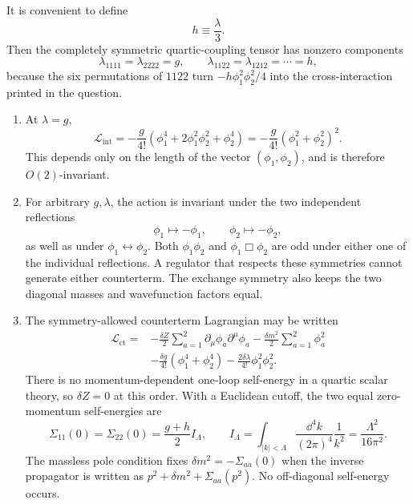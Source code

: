 \begin{enumerate}
It is convenient to define
\[
 h\equiv\frac\lambda3.
\]
Then the completely symmetric quartic-coupling tensor has nonzero
components
\[
 \lambda_{1111}=\lambda_{2222}=g,
 \qquad
 \lambda_{1122}=\lambda_{1212}=\cdots=h,
\]
because the six permutations of \(1122\) turn
\(-h\phi_1^2\phi_2^2/4\) into the cross-interaction printed in the
question.

\begin{enumerate}
\item
At \(\lambda=g\),
\[
 \mathcal L_{\mathrm{int}}
 =-\frac g{4!}\left(
 \phi_1^4+2\phi_1^2\phi_2^2+\phi_2^4\right)
 =-\frac g{4!}(\phi_1^2+\phi_2^2)^2.
\]
This depends only on the length of the vector
\((\phi_1,\phi_2)\), and is therefore \(O(2)\)-invariant.

\item
For arbitrary \(g,\lambda\), the action is invariant under the two
independent reflections
\[
 \phi_1\longmapsto-\phi_1,
 \qquad
 \phi_2\longmapsto-\phi_2,
\]
as well as under \(\phi_1\leftrightarrow\phi_2\).  Both
\(\phi_1\phi_2\) and \(\phi_1\Box\phi_2\) are odd under either one of the
individual reflections.  A regulator that respects these symmetries cannot
generate either counterterm.  The exchange symmetry also keeps the two
diagonal masses and wavefunction factors equal.

\item
The symmetry-allowed counterterm Lagrangian may be written
\[
\begin{aligned}
 \mathcal L_{\mathrm{ct}}={}&
 -\frac{\delta Z}{2}\sum_{a=1}^2
 \partial_\mu\phi_a\partial^\mu\phi_a
 -\frac{\delta m^2}{2}\sum_{a=1}^2\phi_a^2\\
 &-\frac{\delta g}{4!}(\phi_1^4+\phi_2^4)
 -\frac{2\delta\lambda}{4!}\phi_1^2\phi_2^2.
\end{aligned}
\]
There is no momentum-dependent one-loop self-energy in a quartic scalar
theory, so \(\delta Z=0\) at this order.  With a Euclidean cutoff, the two
equal zero-momentum self-energies are
\[
 \Sigma_{11}(0)=\Sigma_{22}(0)
 =\frac{g+h}{2}I_\Lambda,
 \qquad
 I_\Lambda=\int_{|k|<\Lambda}\frac{\dd^4k}{(2\pi)^4}\frac1{k^2}
 =\frac{\Lambda^2}{16\pi^2}.
\]
The massless pole condition fixes
\(\delta m^2=-\Sigma_{aa}(0)\) when the inverse propagator is written as
\(p^2+\delta m^2+\Sigma_{aa}(p^2)\).  No off-diagonal self-energy occurs.


\end{enumerate}
\end{enumerate}
